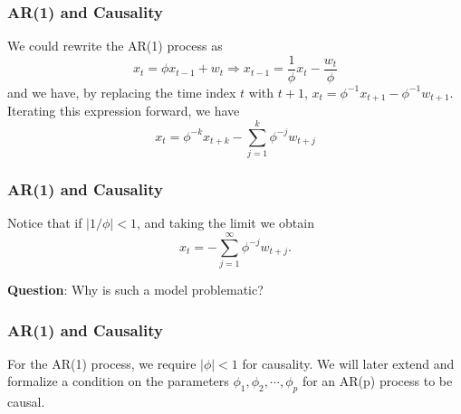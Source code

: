 \documentclass[%
xcolor=pdftex]{beamer}
\begin{document}
\begin{frame}
\frametitle{AR(1) and Causality}

We could rewrite the AR(1) process as
 $$
 x_t=\phi x_{t-1} + w_t  \Rightarrow x_{t-1} = \frac{1}{\phi} x_t - \frac{w_t}{\phi}
 $$
 and we have, by replacing the time index $t$ with $t+1$, $x_t =\phi^{-1} x_{t+1} - \phi^{-1} w_{t+1}$. Iterating this expression
forward, we have
 $$
 x_t=\phi^{-k} x_{t+k}-\sum_{j=1}^{k} \phi^{-j} w_{t+j}
 $$


\end{frame}

\begin{frame}
\frametitle{AR(1) and Causality}

Notice that if $|1/\phi|<1$, and taking the limit we obtain
 $$
 x_t=-\sum_{j=1}^{\infty} \phi^{-j} w_{t+j}.
 $$


\textbf{Question}: Why is such a model problematic?


\end{frame}

\begin{frame}
\frametitle{AR(1) and Causality}

For the AR(1) process, we require $|\phi|<1$ for causality. We will later extend and formalize a condition on the parameters $\phi_1, \phi_2, \cdots, \phi_p$ for an AR(p) process to be causal.


\end{frame}
\end{document}
